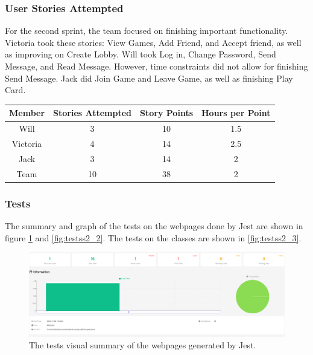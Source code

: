 \documentclass{article}
\begin{document}
\subsubsection{User Stories Attempted}

For the second sprint, the team focused on finishing important functionality. Victoria took these stories: View Games, Add Friend, and Accept friend, as well as improving on Create Lobby. Will took Log in, Change Password, Send Message, and Read Message. However, time constraints did not allow for finishing Send Message. Jack did Join Game and Leave Game, as well as finishing Play Card.

\begin{table}[h]
\centering
\begin{tabular}{|c|c|c|c|}
\hline
\textbf{Member} & \textbf{Stories Attempted} & \textbf{Story Points} & \textbf{Hours per Point} \\ \hline
Will     & 3 & 10  & 1.5 \\ \hline
Victoria & 4 & 14 & 2.5 \\ \hline
Jack     & 3 & 14 & 2 \\ \hline
Team    & 10 & 38 & 2 \\ \hline
\end{tabular}
\end{table}

\subsubsection{Tests}
The summary and graph of the tests on the webpages done by Jest are shown in figure \ref{fig:testss2_1} and \ref{fig:testss2_2}. The tests on the classes are shown in \ref{fig:testss2_3}.

\begin{figure}[h]
\centering
\includegraphics[width=\linewidth]{testss2_1.png}
\caption{\label{fig:testss2_1}The tests visual summary of the webpages generated by Jest.}
\end{figure}
\end{document}
